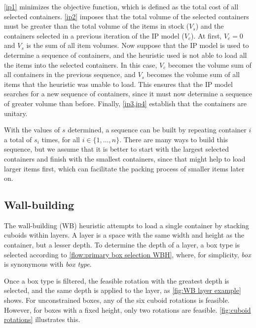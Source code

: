 \cref{ip1} minimizes the objective function, which is defined as the total cost of all selected containers. \cref{ip2} imposes that the total volume of the selected containers must be greater than the total volume of the items in stock ($V_s$) and the containers selected in a previous iteration of the IP model ($V_c$). At first, $V_c = 0$ and $V_s$ is the sum of all item volumes. Now suppose that the IP model is used to determine a sequence of containers, and the heuristic used is not able to load all the items into the selected containers. In this case, $V_c$ becomes the volume sum of all containers in the previous sequence, and $V_s$ becomes the volume sum of all items that the heuristic was unable to load. This ensures that the IP model searches for a new sequence of containers, since it must now determine a sequence of greater volume than before. Finally, \cref{ip3,ip4} establish that the containers are unitary.

With the values of $s$ determined, a sequence can be built by repeating container $i$ a total of $s_i$ times, for all $i \in \{1,\dots,n\}$. There are many ways to build this sequence, but we assume that it is better to start with the largest selected containers and finish with the smallest containers, since that might help to load larger items first, which can facilitate the packing process of smaller items later on.

\subsection{Wall-building}
\label{sec:wb implementation}

The wall-building (WB) heuristic attempts to load a single container by stacking cuboids within layers. A layer is a space with the same width and height as the container, but a lesser depth. To determine the depth of a layer, a box type is selected according to \cref{flow:primary box selection WBH}, where, for simplicity, \emph{box} is synonymous with \emph{box type}.



Once a box type is filtered, the feasible rotation with the greatest depth is selected, and the same depth is applied to the layer, as \cref{fig:WB layer example} shows. For unconstrained boxes, any of the six cuboid rotations is feasible. However, for boxes with a fixed height, only two rotations are feasible. \cref{fig:cuboid rotations} illustrates this.



